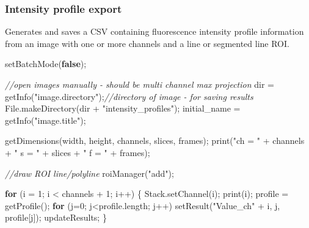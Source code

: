 \documentclass[
  12pt,
  a4paper,
]{book}
\newenvironment{Shaded}{}{}
\newcommand{\CommentTok}[1]{\textcolor[rgb]{0.38,0.63,0.69}{\textit{#1}}}
\newcommand{\ControlFlowTok}[1]{\textcolor[rgb]{0.00,0.44,0.13}{\textbf{#1}}}
\newcommand{\DecValTok}[1]{\textcolor[rgb]{0.25,0.63,0.44}{#1}}
\newcommand{\KeywordTok}[1]{\textcolor[rgb]{0.00,0.44,0.13}{\textbf{#1}}}
\newcommand{\NormalTok}[1]{#1}
\newcommand{\OperatorTok}[1]{\textcolor[rgb]{0.40,0.40,0.40}{#1}}
\newcommand{\StringTok}[1]{\textcolor[rgb]{0.25,0.44,0.63}{#1}}
\begin{document}
\subsubsection{Intensity profile export}\label{intensity-profile-export}

Generates and saves a CSV containing fluorescence intensity profile information from an image with one or more channels and a line or segmented line ROI.

\begin{Shaded}
\begin{Highlighting}[]
\NormalTok{setBatchMode}\OperatorTok{(}\KeywordTok{false}\OperatorTok{);}

\CommentTok{//open images manually {-} should be multi channel max projection}
\NormalTok{dir }\OperatorTok{=}\NormalTok{ getInfo}\OperatorTok{(}\StringTok{"image.directory"}\OperatorTok{);}\CommentTok{//directory of image {-} for saving results}
\NormalTok{File}\OperatorTok{.}\NormalTok{makeDirectory}\OperatorTok{(}\NormalTok{dir }\OperatorTok{+} \StringTok{"intensity\_profiles"}\OperatorTok{);}
\NormalTok{initial\_name }\OperatorTok{=}\NormalTok{ getInfo}\OperatorTok{(}\StringTok{"image.title"}\OperatorTok{);}

\NormalTok{getDimensions}\OperatorTok{(}\NormalTok{width}\OperatorTok{,}\NormalTok{ height}\OperatorTok{,}\NormalTok{ channels}\OperatorTok{,}\NormalTok{ slices}\OperatorTok{,}\NormalTok{ frames}\OperatorTok{);}
\NormalTok{print}\OperatorTok{(}\StringTok{"ch = "} \OperatorTok{+}\NormalTok{ channels }\OperatorTok{+} \StringTok{" s = "} \OperatorTok{+}\NormalTok{ slices }\OperatorTok{+} \StringTok{" f = "} \OperatorTok{+}\NormalTok{ frames}\OperatorTok{);}

\CommentTok{//draw ROI line/polyline}
\NormalTok{roiManager}\OperatorTok{(}\StringTok{"add"}\OperatorTok{);}

\ControlFlowTok{for} \OperatorTok{(}\NormalTok{i }\OperatorTok{=} \DecValTok{1}\OperatorTok{;}\NormalTok{ i }\OperatorTok{\textless{}}\NormalTok{ channels }\OperatorTok{+} \DecValTok{1}\OperatorTok{;}\NormalTok{ i}\OperatorTok{++)} \OperatorTok{\{}
\NormalTok{    Stack}\OperatorTok{.}\NormalTok{setChannel}\OperatorTok{(}\NormalTok{i}\OperatorTok{);}
\NormalTok{    print}\OperatorTok{(}\NormalTok{i}\OperatorTok{);}
\NormalTok{    profile }\OperatorTok{=}\NormalTok{ getProfile}\OperatorTok{();}
    \ControlFlowTok{for} \OperatorTok{(}\NormalTok{j}\OperatorTok{=}\DecValTok{0}\OperatorTok{;}\NormalTok{ j}\OperatorTok{\textless{}}\NormalTok{profile}\OperatorTok{.}\NormalTok{length}\OperatorTok{;}\NormalTok{ j}\OperatorTok{++)}
\NormalTok{      setResult}\OperatorTok{(}\StringTok{"Value\_ch"} \OperatorTok{+}\NormalTok{ i}\OperatorTok{,}\NormalTok{ j}\OperatorTok{,}\NormalTok{ profile}\OperatorTok{[}\NormalTok{j}\OperatorTok{]);}
\NormalTok{    updateResults}\OperatorTok{;}
\OperatorTok{\}}


\end{Highlighting}
\end{Shaded}
\end{document}
